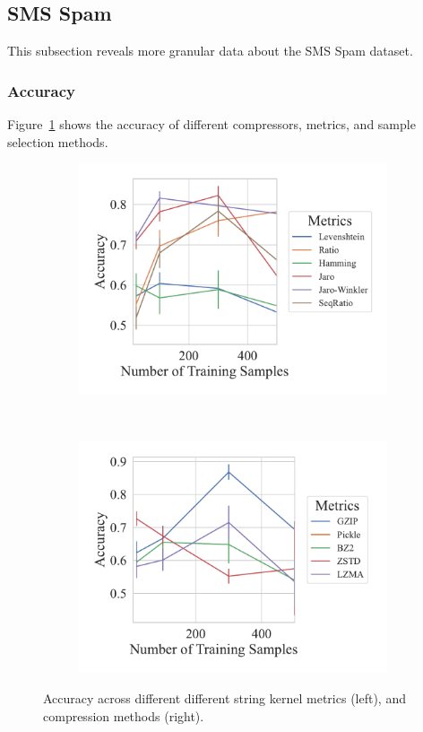 \subsection{SMS Spam}
This subsection reveals more granular data about the SMS Spam dataset.

\subsubsection{Accuracy}
Figure~\ref{fig:sms_spam_accuracy} shows the accuracy of different compressors, metrics, and sample selection methods.

\begin{figure}[h!][h]
	\centering
    \captionsetup[subfigure]{skip=0pt}
	\begin{subfigure}[t]{.44\textwidth}
		\centering
		\includegraphics[width=\textwidth]{figs/sms_spam/string_metric_vs_accuracy.pdf}
	\end{subfigure}
	~
	\begin{subfigure}[t]{.44\textwidth}
		\centering
		\includegraphics[width=\textwidth]{figs/sms_spam/compressor_metric_vs_accuracy.pdf}
	\end{subfigure}
	\caption{Accuracy across different different string kernel metrics (left), and compression methods (right).}
	\label{fig:sms_spam_accuracy}
\end{figure}

